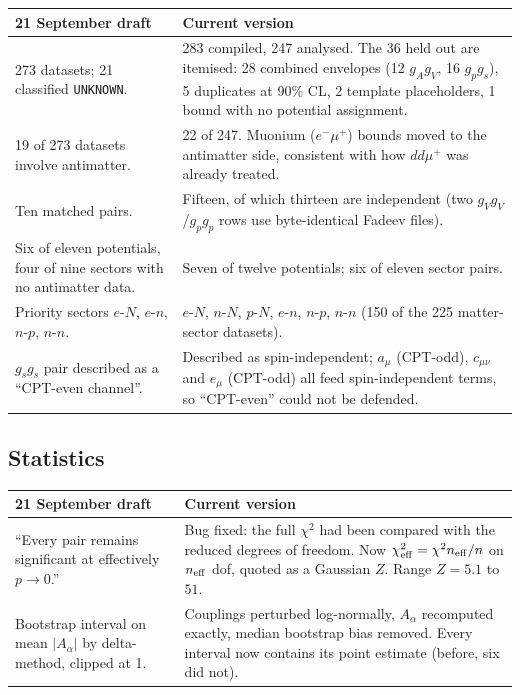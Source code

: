 \documentclass[11pt,a4paper]{article}
\newcommand{\Aa}{A_\alpha}
\begin{document}
\begin{longtable}{@{}p{}p{}@{}}
\toprule
\textbf{21 September draft} & \textbf{Current version} \\
\midrule
\endhead
273 datasets; 21 classified \texttt{UNKNOWN}.
& 283 compiled, 247 analysed. The 36 held out are itemised: 28 combined
envelopes (12 $g_Ag_V$, 16 $g_pg_s$), 5 duplicates at 90\% CL, 2 template
placeholders, 1 bound with no potential assignment. \\[0.4em]
19 of 273 datasets involve antimatter.
& 22 of 247. Muonium ($e^-\mu^+$) bounds moved to the antimatter side,
consistent with how $dd\mu^+$ was already treated. \\[0.4em]
Ten matched pairs.
& Fifteen, of which thirteen are independent (two $g_Vg_V$/$g_pg_p$ rows
use byte-identical Fadeev files). \\[0.4em]
Six of eleven potentials, four of nine sectors with no antimatter data.
& Seven of twelve potentials; six of eleven sector pairs. \\[0.4em]
Priority sectors $e$-$N$, $e$-$n$, $n$-$p$, $n$-$n$.
& $e$-$N$, $n$-$N$, $p$-$N$, $e$-$n$, $n$-$p$, $n$-$n$ (150 of the 225
matter-sector datasets). \\[0.4em]
$g_sg_s$ pair described as a ``CPT-even channel''.
& Described as spin-independent; $a_\mu$ (CPT-odd), $c_{\mu\nu}$ and
$e_\mu$ (CPT-odd) all feed spin-independent terms, so ``CPT-even'' could
not be defended. \\
\bottomrule
\end{longtable}

\subsection{Statistics}

\begin{longtable}{@{}p{}p{}@{}}
\toprule
\textbf{21 September draft} & \textbf{Current version} \\
\midrule
\endhead
``Every pair remains significant at effectively $p\to0$.''
& Bug fixed: the full $\chi^2$ had been compared with the reduced
degrees of freedom. Now $\chi^2_{\rm eff}=\chi^2 n_{\rm eff}/n$ on
$n_{\rm eff}$ dof, quoted as a Gaussian $Z$. Range $Z=5.1$ to $51$. \\[0.4em]
Bootstrap interval on mean $|\Aa|$ by delta-method, clipped at 1.
& Couplings perturbed log-normally, $\Aa$ recomputed exactly, median
bootstrap bias removed. Every interval now contains its point estimate
(before, six did not). \\
\bottomrule
\end{longtable}
\end{document}
